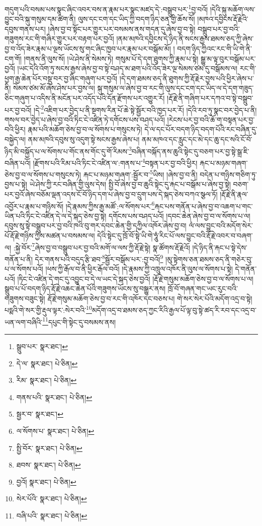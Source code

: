 གདུག་པའི་བསམ་པས་སྣང་ཞིང་འབར་བས་ན་རྣམ་པར་སྣང་མཛད་དེ་:བསྒྲུབ་པར་\footnote{སྒྲུབ་པར་  སྣར་ཐང་། }བྱ་བའོ། །དེའི་སྐུ་མཆོག་ལས་བྱུང་བའི་སྐུ་གསུམ་དམ་ཚིག་ནི། ལུས་དང་ངག་དང་ཡིད་ཀྱི་བདག་ཉིད་ཅན་གྱི་ཆོས་སོ། །མཁའ་དབྱིངས་རྡོ་རྗེའི་དབུས་གནས་པར། །ཞེས་བྱ་བ་སྟོང་པར་གྱུར་པར་བསམས་ནས་གདན་དུ་ཞེས་བྱ་བ་སྟེ། བསྒྲུབ་པར་བྱ་བའི་གཟུགས་རང་གི་གཞིར་གྱུར་པར་བརྟག་པར་བྱའོ། །ནམ་མཁའི་དབྱིངས་དེ་ཉིད་ནི་སངས་རྒྱས་ཐམས་ཅད་ཀྱི་ཞེས་བྱ་བ་འོད་ཟེར་རྣམ་པ་ལྔས་ཡོངས་སུ་གང་ཞིང་ཁྱབ་པར་རྣམ་པར་བསྒོམ་མོ། །
བདག་ཉིད་ཀྱིའང་རང་གི་ཡི་གེ་ནི་ངག་གོ། །གནས་ནི་ལུས་སོ། །ཡེ་ཤེས་ནི་སེམས་ཏེ། གསུམ་པོ་དེ་དག་ཐུགས་ཀྱི་རྣམ་པ་སྟེ། སྒྱུ་མ་ལྟ་བུར་བསྒོམ་པར་བྱའོ། །ཡང་དེའི་འོག་ཏུ་སངས་རྒྱས་ཞེས་བྱ་བ་སྟེ་བཤད་མ་ཐག་པའི་འོད་ཟེར་ལྔ་སེམས་ཙམ་དུ་བསྒོམས་ལ། རང་གི་ཕྱག་རྒྱ་ཆེན་པོར་བསྡུ་བར་བྱ་ཞིང་གཞུག་པར་བྱའོ། །དེ་དག་ཐམས་ཅད་ནི་ཐུགས་ཀྱི་རྡོ་རྗེར་བྱས་པའི་ཕྱིར་ཞེས་པ་ནི། སེམས་ཙམ་མོ་ཞེས་ཤེས་པར་བྱས་ལ། སྐུ་གསུམ་ལ་ཞེས་བྱ་བ་རང་གི་ལུས་དང་ངག་དང་ཡིད་ལ་དེ་དག་གཟུད་ཅིང་གཞུག་པ་འདིས་ནི་མངོན་པར་འདོད་པའི་དོན་རྫོགས་པར་འགྱུར་རོ། །རྡོ་རྗེ་ནི་གཞིག་པར་དཀའ་བ་སྟེ་བསྒྲུབ་པར་བྱ་བའོ། །དེ་\footnote{དེ་ལ་  སྣར་ཐང་།  པེ་ཅིན། }འཇིག་པར་བྱེད་པ་ནི་སྔགས་རིན་པོ་ཆེ་སྟེ་སྦྱོར་བའི་ཁྱད་པར་རོ། །དེའི་རབ་ཏུ་སྣང་བར་བྱེད་པ་ནི། གསལ་བར་བྱེད་པ་ཞེས་བྱ་བའི་ཏིང་ངེ་འཛིན་ཏེ་དགོངས་པས་བཤད་པའོ། །རེངས་པར་བྱ་བའི་ཆོ་ག་བསྟན་པར་བྱ་བའི་ཕྱིར། རྣམ་པའི་མཆོག་ཅེས་བྱ་བ་ལ་སོགས་པ་གསུངས་ཏེ། དེ་ལ་དང་པོར་བདག་ཉིད་བདག་པོའི་རང་བཞིན་དུ་བསྐྱེད་ལ། ནམ་མཁའི་དབུས་སུ་འདུག་སྟེ་སངས་རྒྱས་ཞེས་པ། ནམ་མཁའ་དང་རླུང་དང་མེ་དང་ཆུ་དང་སའི་ངོ་བོ་ཉིད་མི་བསྐྱོད་པ་ལ་སོགས་པ་གོང་ནས་གོང་དུ་གོ་རིམས་\footnote{རིམ་  སྣར་ཐང་།  པེ་ཅིན། }བཞིན་བསྐོད་ནས་ཆུའི་སྟེང་དུ་བཅག་པར་བྱ་སྟེ་སྒྲ་ཇི་བཞིན་པའོ། །རྫོགས་པའི་རིམ་པའི་ཏིང་ངེ་འཛིན་ལ་:གནས་པ་\footnote{གནས་པའི་  སྣར་ཐང་།  པེ་ཅིན། }བསྟན་པར་བྱ་བའི་ཕྱིར། རྐང་པ་མཉམ་གཞག་ཅེས་བྱ་བ་ལ་སོགས་པ་གསུངས་ཏེ། རྐང་པ་མཉམ་གཞག་:སྦྱོར་བ་\footnote{སྦྱར་བ་  སྣར་ཐང་། }ཡིས། །ཞེས་བྱ་བ་ནི། བདེན་པ་གཉིས་གཅིག་ཏུ་བྱས་པ་སྟེ། ཡེ་ཤེས་ཀྱི་རང་བཞིན་གྱི་ལུས་དེས། སྤྱི་བོ་ཞེས་བྱ་བ་ཆུའི་སྟེང་དུ་རྐང་པ་བསྒོམ་པ་ཞེས་བྱ་སྟེ། བཅག་པར་བྱའོ་ཞེས་བཅོམ་ལྡན་འདས་ངོ་བོ་ཉིད་དག་པ་ཞེས་བྱ་བ་དྲུག་པས་དེ་སྐད་ཅེས་བཀའ་སྩལ་ཏོ། །རྡོ་རྗེ་ནི་རྣལ་འབྱོར་པ་རྣམ་པ་གཉིས་སོ། །དེ་རྣམས་ཀྱིས་རྒྱ་མཚོ་:ལ་སོགས་པར་\footnote{ལ་སོགས་པ་  སྣར་ཐང་།  པེ་ཅིན། }རྐང་པས་གནོན་པ་ཞེས་བྱ་བ་འཆག་པ་གང་ཡིན་པའི་ཏིང་ངེ་འཛིན་དེ་ལ་དེ་སྐད་ཅེས་བྱ་སྟེ། དགོངས་པས་བཤད་པའོ། །དབང་ཆེན་ཞེས་བྱ་བ་ལ་སོགས་པ་ལ། དབུས་སུ་སྟེ་བསྒྲུབ་པར་བྱ་བའི་ཁའི་བུ་གར་དབང་ཆེན་གྱི་དཀྱིལ་འཁོར་ཞེས་བྱ་བ། ལཾ་ལས་བྱུང་བའི་མདོག་སེར་པོ་རྡོ་རྗེ་གཉིས་ཀྱིས་མཚན་པ་བསམས་ལ། དེའི་སྟེང་དུ་ཁྲོ་བོ་སྟེ་ཡི་གེ་ཧཱུཾ་རིང་པོ་ལས་བྱུང་བའི་རྡོ་རྗེ་འབར་བ་བཞག་ལ། :སྐྱེ་བོར་\footnote{སྤྱི་བོར་  སྣར་ཐང་།  པེ་ཅིན། }ཞེས་བྱ་བ་བསྒྲུབ་པར་བྱ་བའི་མགོ་ལ་ལས་ཀྱི་རྡོ་རྗེ་སྟེ། སྣ་ཚོགས་རྡོ་རྗེའོ། །དེ་ཉིད་ནི་རྐང་པ་སྟེ་དེས་གནོན་པ་ནི། དེར་གནས་པའི་བདུད་རྩི་ཐབ་\footnote{ཐབས་  སྣར་ཐང་།  པེ་ཅིན། }སྦྱོར་བསྒོམ་པར་:བྱ་བའོ།\footnote{བྱའོ།  སྣར་ཐང་།  པེ་ཅིན། } །མུ་སྟེགས་ཅན་ཐམས་ཅད་ནི་གཅེར་བུ་པ་ལ་སོགས་པའོ། །ཕས་ཀྱི་རྒོལ་བ་ནི་ཕྱིར་རྒོལ་བའོ། །དེ་རྣམས་ཀྱི་འཁྲུལ་འཁོར་ནི་ལུས་ལ་སོགས་པ་སྟེ། དེ་གནོན་པའོ། །ཏིང་ངེ་འཛིན་དེ་གང་དུ་འབྱུང་བ་དེ་ལ་ཡང་དེ་སྐད་ཅེས་བྱའོ། །རྡོ་རྗེ་གསུམ་མཆོག་ཅེས་བྱ་བ་ལ་སོགས་པ་ལ། སྒྲུབ་པ་པོ་བདག་ཉིད་རྡོ་རྗེ་འཆང་ཆེན་པོའི་གཟུགས་ཡོངས་སུ་བསྒྱུར་ནས། ཁྲོ་བོ་གཞན་གང་ཡང་རུང་བའི་གཟུགས་བཟུང་སྟེ། རྡོ་རྗེ་གསུམ་མཆོག་ཅེས་བྱ་བ་རང་གི་འཁོར་དང་བཅས་པ། གེ་སར་སེར་པོའི་མདོག་འདྲ་བ་སྟེ། པདྨའི་གེ་སར་གྱི་རྡུལ་ལྟར་:སེར་བའི་\footnote{སེར་པོའི་  སྣར་ཐང་།  པེ་ཅིན། }མདོག་འདྲ་བ་ཐམས་ཅད་ཀྱང་རིའི་རྒྱལ་པོ་ལྟ་བུ་སྟེ་ཚད་རི་རབ་དང་འདྲ་བ་ཡན་ལག་བཞིའི་\footnote{བཞི་པའི་  སྣར་ཐང་།  པེ་ཅིན། }དཔུང་གི་སྟེང་དུ་བསམས་ནས། 